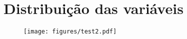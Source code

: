 \chapter{Distribuição das variáveis}
\label{app:distrib}

\begin{figure}
  \raggedleft
  \texttt{[image: figures/test2.pdf]}
\end{figure}
